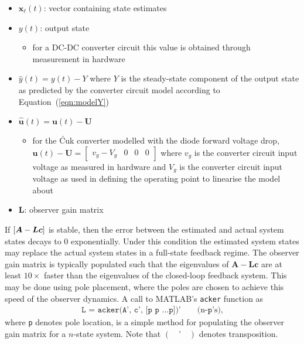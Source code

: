 \begin{itemize}
    \item $\boldsymbol{x}_\ell(t)$: vector containing state estimates
    \item $y(t)$: output state
    \begin{itemize}
        \item for a DC-DC converter circuit this value is obtained through measurement in hardware
    \end{itemize}
    \item $\hat{y}(t) = y(t) - Y$ where $Y$ is the steady-state component of the output state as predicted by the converter circuit model according to Equation~(\ref{eqn:modelY})
    \item $\hat{\boldsymbol{u}}(t) = \boldsymbol{u}(t) - \boldsymbol{U}$
    \begin{itemize}
        \item for the \'Cuk converter modelled with the diode forward voltage drop, $\boldsymbol{u}(t) - \boldsymbol{U} = \begin{bmatrix}v_g - V_g & 0 & 0 & 0\end{bmatrix}$ where $v_g$ is the converter circuit input voltage as measured in hardware and $V_g$ is the converter circuit input voltage as used in defining the operating point to linearise the model about
    \end{itemize}
    \item $\boldsymbol{L}$: observer gain matrix
\end{itemize}
If $\left[\boldsymbol{A} - \boldsymbol{L}\boldsymbol{c}\right]$ is stable, then the error between the estimated and actual system states decays to 0 exponentially. Under this condition the estimated system states may replace the actual system states in a full-state feedback regime.
\newpar
The observer gain matrix is typically populated such that the eigenvalues of $\boldsymbol{A} - \boldsymbol{L}\boldsymbol{c}$ are at least $10 \times$ faster than the eigenvalues of the closed-loop feedback system. This may be done using pole placement, where the poles are chosen to achieve this speed of the observer dynamics. A call to \textsf{MATLAB}'s \texttt{acker} function as
\begin{align}
\texttt{L = acker(A', c', [p p \ldots p])'} \qquad \text{(n-}\texttt{p}\text{'s)},
\label{matlab:place}
\end{align}
where \texttt{p} denotes pole location, is a simple method for populating the observer gain matrix for a $n$-state system. Note that $(\quad\texttt{'}\quad)$ denotes transposition.
